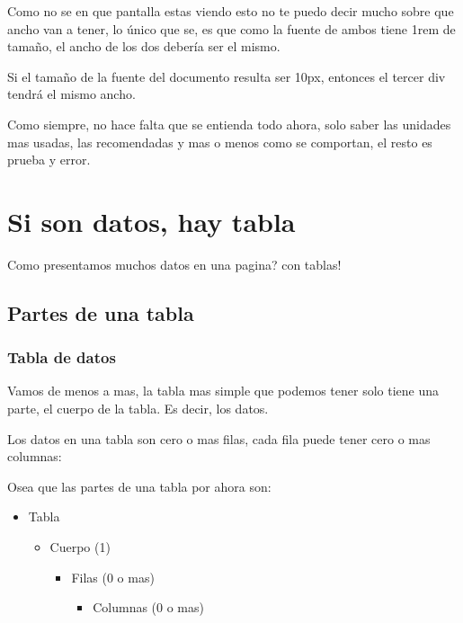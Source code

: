 \documentclass[letterpaper,10pt,spanish]{sphinxmanual}
\begin{document}
Como no se en que pantalla estas viendo esto no te puedo decir mucho sobre que
ancho van a tener, lo único que se, es que como la fuente de ambos tiene 1rem
de tamaño, el ancho de los dos debería ser el mismo.

Si el tamaño de la fuente del documento resulta ser 10px, entonces el tercer
div tendrá el mismo ancho.

Como siempre, no hace falta que se entienda todo ahora, solo saber las unidades
mas usadas, las recomendadas y mas o menos como se comportan, el resto es
prueba y error.


\chapter{Si son datos, hay tabla}
\label{\detokenize{hay-tabla:si-son-datos-hay-tabla}}\label{\detokenize{hay-tabla::doc}}
Como presentamos muchos datos en una pagina? con tablas!


\section{Partes de una tabla}
\label{\detokenize{hay-tabla:partes-de-una-tabla}}

\subsection{Tabla de datos}
\label{\detokenize{hay-tabla:tabla-de-datos}}
Vamos de menos a mas, la tabla mas simple que podemos tener solo tiene una
parte, el cuerpo de la tabla. Es decir, los datos.

Los datos en una tabla son cero o mas filas, cada fila puede tener cero o mas
columnas:

Osea que las partes de una tabla por ahora son:
\begin{itemize}
\item {} 
Tabla
\begin{itemize}
\item {} 
Cuerpo (1)
\begin{itemize}
\item {} 
Filas (0 o mas)
\begin{itemize}
\item {} 
Columnas (0 o mas)

\end{itemize}

\end{itemize}

\end{itemize}

\end{itemize}
\end{document}
